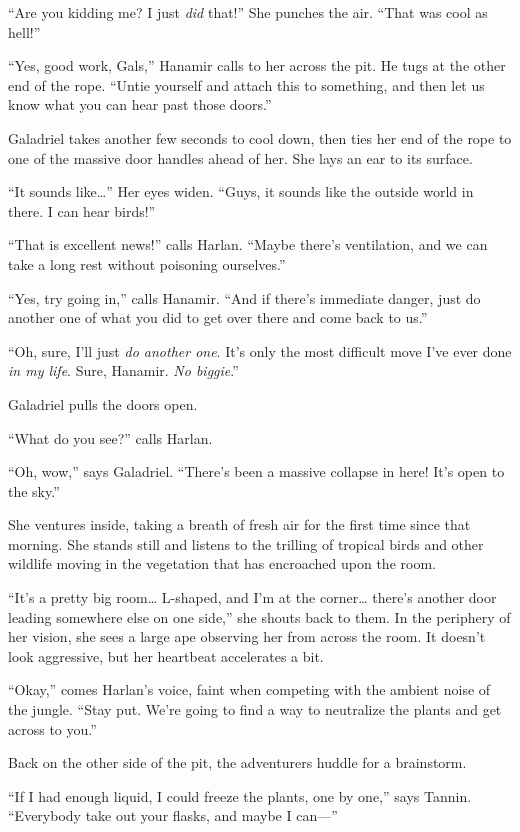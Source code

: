 \documentclass[smalldemyvopaper,11pt,twoside,onecolumn,openright,extrafontsizes]{memoir}
\begin{document}
``Are you kidding me? I just \emph{did} that!'' She punches the air.
``That was cool as hell!''

``Yes, good work, Gals,'' Hanamir calls to her across the pit. He tugs
at the other end of the rope. ``Untie yourself and attach this to
something, and then let us know what you can hear past those doors.''

Galadriel takes another few seconds to cool down, then ties her end of
the rope to one of the massive door handles ahead of her. She lays an
ear to its surface.

``It sounds like\ldots{}'' Her eyes widen. ``Guys, it sounds like the
outside world in there. I can hear birds!''

``That is excellent news!'' calls Harlan. ``Maybe there's ventilation,
and we can take a long rest without poisoning ourselves.''

``Yes, try going in,'' calls Hanamir. ``And if there's immediate danger,
just do another one of what you did to get over there and come back to
us.''

``Oh, sure, I'll just \emph{do another one}. It's only the most
difficult move I've ever done \emph{in my life}. Sure, Hanamir. \emph{No
biggie}.''

Galadriel pulls the doors open.

``What do you see?'' calls Harlan.

``Oh, wow,'' says Galadriel. ``There's been a massive collapse in here!
It's open to the sky.''

She ventures inside, taking a breath of fresh air for the first time
since that morning. She stands still and listens to the trilling of
tropical birds and other wildlife moving in the vegetation that has
encroached upon the room.

``It's a pretty big room\ldots{} L-shaped, and I'm at the corner\ldots{}
there's another door leading somewhere else on one side,'' she shouts
back to them. In the periphery of her vision, she sees a large ape
observing her from across the room. It doesn't look aggressive, but her
heartbeat accelerates a bit.

``Okay,'' comes Harlan's voice, faint when competing with the ambient
noise of the jungle. ``Stay put. We're going to find a way to neutralize
the plants and get across to you.''

Back on the other side of the pit, the adventurers huddle for a
brainstorm.

``If I had enough liquid, I could freeze the plants, one by one,'' says
Tannin. ``Everybody take out your flasks, and maybe I can---''
\end{document}
